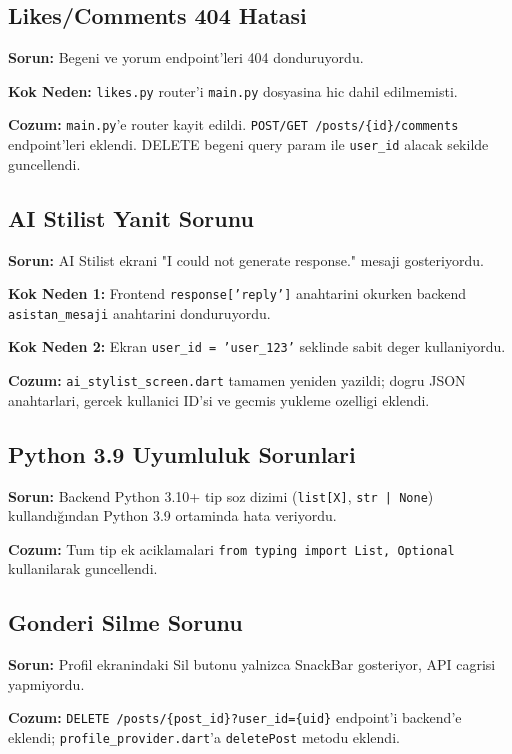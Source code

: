 \documentclass[conference]{IEEEtran}
\begin{document}
\subsection{Likes/Comments 404 Hatasi}

\textbf{Sorun:} Begeni ve yorum endpoint'leri 404 donduruyordu.

\textbf{Kok Neden:} \texttt{likes.py} router'i \texttt{main.py} dosyasina hic dahil edilmemisti.

\textbf{Cozum:} \texttt{main.py}'e router kayit edildi. \texttt{POST/GET /posts/\{id\}/comments} endpoint'leri eklendi. DELETE begeni query param ile \texttt{user\_id} alacak sekilde guncellendi.

\subsection{AI Stilist Yanit Sorunu}

\textbf{Sorun:} AI Stilist ekrani "I could not generate response." mesaji gosteriyordu.

\textbf{Kok Neden 1:} Frontend \texttt{response['reply']} anahtarini okurken backend \texttt{asistan\_mesaji} anahtarini donduruyordu.

\textbf{Kok Neden 2:} Ekran \texttt{user\_id = 'user\_123'} seklinde sabit deger kullaniyordu.

\textbf{Cozum:} \texttt{ai\_stylist\_screen.dart} tamamen yeniden yazildi; dogru JSON anahtarlari, gercek kullanici ID'si ve gecmis yukleme ozelligi eklendi.

\subsection{Python 3.9 Uyumluluk Sorunlari}

\textbf{Sorun:} Backend Python 3.10+ tip soz dizimi (\texttt{list[X]}, \texttt{str | None}) kullandığından Python 3.9 ortaminda hata veriyordu.

\textbf{Cozum:} Tum tip ek aciklamalari \texttt{from typing import List, Optional} kullanilarak guncellendi.

\subsection{Gonderi Silme Sorunu}

\textbf{Sorun:} Profil ekranindaki Sil butonu yalnizca SnackBar gosteriyor, API cagrisi yapmiyordu.

\textbf{Cozum:} \texttt{DELETE /posts/\{post\_id\}?user\_id=\{uid\}} endpoint'i backend'e eklendi; \texttt{profile\_provider.dart}'a \texttt{deletePost} metodu eklendi.
\end{document}
